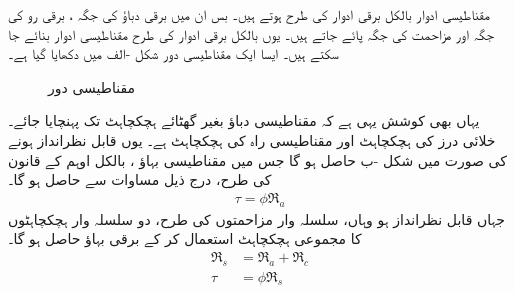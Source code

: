 مقناطیسی ادوار بالکل برقی ادوار کی طرح ہوتے ہیں۔ بس ان میں برقی دباؤ  کی جگہ   ، برقی رو   کی جگہ    اور مزاحمت  کی جگہ     پائے جاتے ہیں۔ یوں  بالکل برقی ادوار کی طرح مقناطیسی ادوار بنائے جا سکتے ہیں۔  ایسا ایک مقناطیسی دور شکل -الف میں دکھایا گیا ہے۔
\begin{figure}
\centering
\begin{subfigure}[b]{0.40\textwidth}
\centering
{}%
\caption{}
\end{subfigure}\hfill
\begin{subfigure}[b]{0.50\textwidth}
\centering
{}
\caption{}
\end{subfigure}
\caption{مقناطیسی دور}
\label{شکل_مقناطیسی__مقناطیسی_سلسلہ_وار_دور}
\end{figure}
%
یہاں بھی کوشش یہی ہے کہ  مقناطیسی دباؤ   بغیر گھٹائے ہچکچاہٹ  تک پہنچایا جائے۔ خلائی درز کی ہچکچاہٹ     اور مقناطیسی راہ کی ہچکچاہٹ   ہے۔ یوں  قابل نظرانداز ہونے کی صورت میں  شکل -ب حاصل ہو گا جس میں مقناطیسی بہاؤ ، بالکل اوہم کے قانون کی طرح، درج ذیل مساوات سے حاصل ہو گا۔
\begin{align}\label{مساوات_مقناطیسی_دور_قانون_اوہم}
\tau=\phi \Re_a
\end{align}
جہاں   قابل  نظرانداز ہو وہاں، سلسلہ وار مزاحمتوں کی طرح،  دو سلسلہ وار ہچکچاہٹوں کا مجموعی ہچکچاہٹ    استعمال کر کے برقی بہاؤ حاصل ہو گا۔
\begin{align}
\Re_s&=\Re_a+\Re_c\\
\tau&=\phi \Re_s \label{مساوات_مقناطیسی_دور_مقناطیسی_اوہم_قانون}
\end{align}

